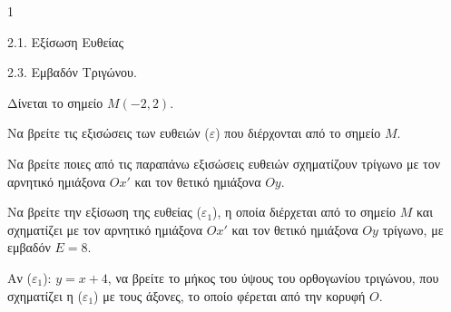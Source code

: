 \begin{ylh}{1}
    \item 2.1. Εξίσωση Ευθείας
    \item 2.3. Εμβαδόν Τριγώνου.
\end{ylh}
Δίνεται το σημείο $M(-2, 2)$.
\begin{alist}
\item Να βρείτε τις εξισώσεις των ευθειών ($\varepsilon$) που διέρχονται από το σημείο $M$. 
\item
    \begin{rlist}
    \item Να βρείτε ποιες από τις παραπάνω εξισώσεις ευθειών σχηματίζουν τρίγωνο με τον αρνητικό ημιάξονα $Ox'$ και τον θετικό ημιάξονα $Oy$. 
    \item Να βρείτε την εξίσωση της ευθείας ($\varepsilon_1$), η οποία διέρχεται από το σημείο $M$ και σχηματίζει με τον αρνητικό ημιάξονα $Ox'$ και τον θετικό ημιάξονα $Oy$ τρίγωνο, με εμβαδόν $E = 8$. 
    \end{rlist}
\item Αν ($\varepsilon_1$): $y = x + 4$, να βρείτε το μήκος του ύψους του ορθογωνίου τριγώνου, που σχηματίζει η ($\varepsilon_1$) με τους άξονες, το οποίο φέρεται από την κορυφή $O$. 
\end{alist}